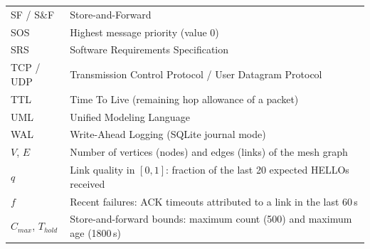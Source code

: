 \begin{longtable}{L{3.2cm}L{12.4cm}}
SF / S\&F & Store-and-Forward\\
SOS & Highest message priority (value 0)\\
SRS & Software Requirements Specification\\
TCP / UDP & Transmission Control Protocol / User Datagram Protocol\\
TTL & Time To Live (remaining hop allowance of a packet)\\
UML & Unified Modeling Language\\
WAL & Write-Ahead Logging (SQLite journal mode)\\
$V$, $E$ & Number of vertices (nodes) and edges (links) of the mesh graph\\
$q$ & Link quality in $[0,1]$: fraction of the last 20 expected HELLOs received\\
$f$ & Recent failures: ACK timeouts attributed to a link in the last 60\,s\\
$C_{max}$, $T_{hold}$ & Store-and-forward bounds: maximum count (500) and maximum age (1800\,s)\\
\bottomrule
\end{longtable}
